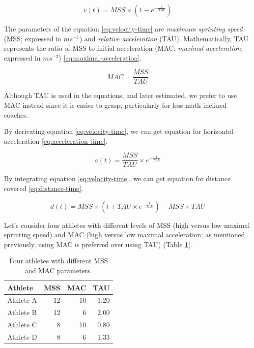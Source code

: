 \documentclass[fleqn,10pt]{wlpeerj} %
\begin{document}
\begin{equation}
  v(t) = MSS \times (1 - e^{-\frac{t}{TAU}}) \label{eq:velocity-time}
\end{equation}

The parameters of the equation \eqref{eq:velocity-time} are \emph{maximum sprinting speed} (MSS; expressed in \(ms^{-1}\)) and \emph{relative acceleration} (TAU). Mathematically, TAU represents the ratio of MSS to initial acceleration (MAC; \emph{maximal acceleration}, expressed in \(ms^{-2}\)) \eqref{eq:maximal-acceleration}.

\begin{equation}
  MAC = \frac{MSS}{TAU}\label{eq:maximal-acceleration}
\end{equation}

Although TAU is used in the equations, and later estimated, we prefer to use MAC instead since it is easier to grasp, particularly for less math inclined coaches.

By derivating equation \eqref{eq:velocity-time}, we can get equation for horizontal acceleration \eqref{eq:acceleration-time}.

\begin{equation}
  a(t) = \frac{MSS}{TAU} \times e^{-\frac{t}{TAU}}  \label{eq:acceleration-time}
\end{equation}

By integrating equation \eqref{eq:velocity-time}, we can get equation for distance covered \eqref{eq:distance-time}.

\begin{equation}
  d(t) = MSS \times (t + TAU \times e^{-\frac{t}{TAU}}) - MSS \times TAU  \label{eq:distance-time}
\end{equation}

Let's consider four athletes with different levels of MSS (high versus low maximal sprinting speed) and MAC (high versus low maximal acceleration; as mentioned previously, using MAC is preferred over using TAU) (Table \ref{tab:four-athletes-table}).

\small

\begin{table}

\caption{\label{tab:four-athletes-table}Four athletes with different MSS and MAC parameters.}
\centering
\begin{tabular}[t]{lrrr}
\toprule
Athlete & MSS & MAC & TAU\\
\midrule
Athlete A & 12 & 10 & 1.20\\
Athlete B & 12 & 6 & 2.00\\
Athlete C & 8 & 10 & 0.80\\
Athlete D & 8 & 6 & 1.33\\
\bottomrule
\end{tabular}
\end{table}
\end{document}
